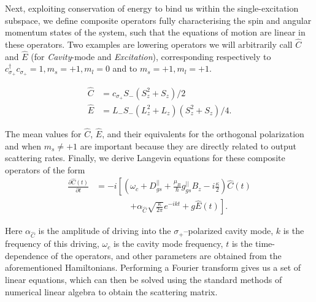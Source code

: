 \documentclass[aps,pra,amsmath,amssymb,reprint,superscriptaddress,tightenlines]{revtex4-1}
\begin{document}
Next, exploiting conservation of energy to bind us within the single-excitation subspace, we define composite operators fully characterising the spin and angular momentum states of the system, such that the equations of motion are linear in these operators. Two examples are lowering operators we will arbitrarily call $\hat{C}$ and $\hat{E}$ (for \emph{Cavity}-mode and \emph{Excitation}), corresponding respectively to $c^{\dagger}_{\sigma_{+}}c_{\sigma_{+}}=1,m_{s}=+1,m_{l}=0$ and to $m_{s}=+1,m_{l}=+1$.

\begin{align}
	\hat{C} &= c_{\sigma_{+}} S_{-} \left( S^{2}_{z} + S_{z} \right)/2\\
	\hat{E} &= L_{-} S_{-} \left( L^{2}_{z} + L_{z} \right) \left( S^{2}_{z} + S_{z} \right)/4.
\end{align}

The mean values for $\hat{C}$, $\hat{E}$, and their equivalents for the orthogonal polarization and when $m_{s}\neq +1$ are important because they are directly related to output scattering rates. Finally, we derive Langevin equations for these composite operators of the form
\begin{align}
	 \frac{\partial\hat{C}(t)}{\partial t} &= -i \left[ \left( \omega_{c} + D^{||}_{gs} + \frac{\mu_{B}}{\hbar} g^{||}_{gs} B_{z} - i \frac{\kappa}{2} \right) \hat{C} (t) \right. \nonumber\\
		&\qquad \qquad \left. + \alpha_{\hat{C}} \sqrt{\frac{\kappa}{2\pi}} e^{-ikt} + g \hat{E} (t) \right].
\end{align}

Here $\alpha_{\hat{C}}$ is the amplitude of driving into the $\sigma_{+}$--polarized cavity mode, $k$ is the frequency of this driving, $\omega_{c}$ is the cavity mode frequency, $t$ is the time-dependence of the operators, and other parameters are obtained from the aforementioned Hamiltonians. Performing a Fourier transform gives us a set of linear equations, which can then be solved using the standard methods of numerical linear algebra to obtain the scattering matrix.
\end{document}
